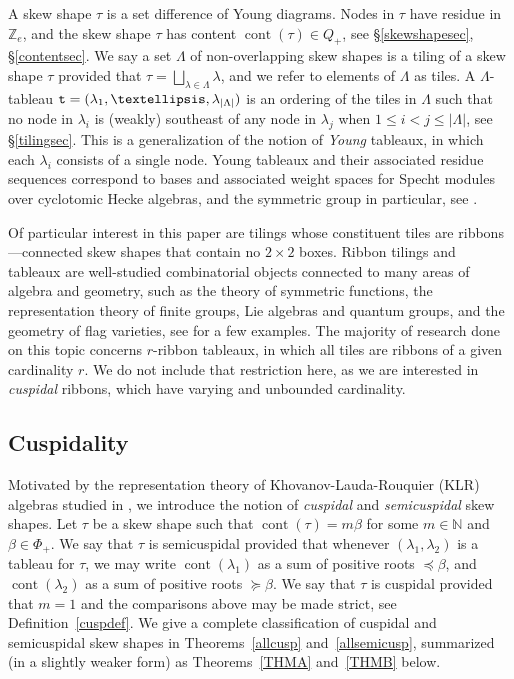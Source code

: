 \documentclass[Unicode,ALCO]{cedram}
\newcommand{\0}{{\bar 0}}
\newcommand{\ttt}{{\tt t}}
\newcommand{\ZZ}{{\mathbb Z}}
\newcommand{\NN}{{\mathbb N}}
\def\cont{{\operatorname{cont}}}
\begin{document}
A skew shape \(\tau\) is a set difference of Young diagrams. Nodes in \(\tau\) have residue in \(\ZZ_e\), and the skew shape \(\tau\) has content \(\cont(\tau) \in Q_+\), see \S\ref{skewshapesec}, \S\ref{contentsec}.
We say a set \(\Lambda\) of non-overlapping skew shapes is a tiling of a skew shape \(\tau\) provided that \(\tau = \bigsqcup_{\lambda \in \Lambda}\lambda\), and we refer to elements of \(\Lambda\) as tiles. A \(\Lambda\)-tableau \(\ttt = (\lambda_1, \ldots, \lambda_{|\Lambda|})\)  is an ordering of the tiles in \(\Lambda\) such that no node in \(\lambda_i\) is (weakly) southeast of any node in \(\lambda_j\) when \(1 \leq i < j \leq |\Lambda|\), see \S\ref{tilingsec}. This is a generalization of the notion of {\em Young} tableaux, in which each \(\lambda_i\) consists of a single node. Young tableaux and their associated residue sequences correspond to bases and associated weight spaces for Specht modules over cyclotomic Hecke algebras, and the symmetric group in particular, see \cite{MathasBookHecke, KlBookLinProj}.

Of particular interest in this paper are tilings whose constituent tiles are ribbons---connected skew shapes that contain no \(2 \times 2\) boxes.
Ribbon tilings and tableaux are well-studied combinatorial objects connected to many areas of algebra and geometry, such as the theory of symmetric functions, the representation theory of finite groups, Lie algebras and quantum groups, and the geometry of flag varieties, see \cite{FoStRimHk, LLTRibbon, ShefRib} for a few examples. The majority of research done on this topic concerns \(r\)-ribbon tableaux, in which all tiles are ribbons of a given cardinality \(r\). We do not include that restriction here, as we are interested in {\em cuspidal} ribbons, which have varying and unbounded cardinality.


\subsection{Cuspidality}\label{cuspint}
Motivated by the representation theory of Khovanov-Lauda-Rouquier (KLR) algebras studied in \cite{KlCuspSys, KlMuStrat, McNRepKLR3}, we introduce the notion of {\em cuspidal} and {\em semicuspidal} skew shapes. Let \(\tau\) be a skew shape such that \(\cont(\tau) = m \beta\) for some \(m \in \NN\) and \(\beta \in \Phi_+\). We say that \(\tau\) is semicuspidal provided that whenever \((\lambda_1, \lambda_2)\) is a tableau for \(\tau\), we may write \(\cont(\lambda_1)\) as a sum of positive roots \(\preceq \beta\), and \(\cont(\lambda_2)\) as a sum of positive roots \(\succeq \beta\). We say that \(\tau\) is cuspidal provided that \(m=1\) and the comparisons above may be made strict, see Definition~\ref{cuspdef}. 
We give a complete classification of cuspidal and semicuspidal skew shapes in Theorems~\ref{allcusp} and~\ref{allsemicusp}, summarized (in a slightly weaker form) as Theorems~\ref{THMA} and~\ref{THMB} below.
\end{document}
